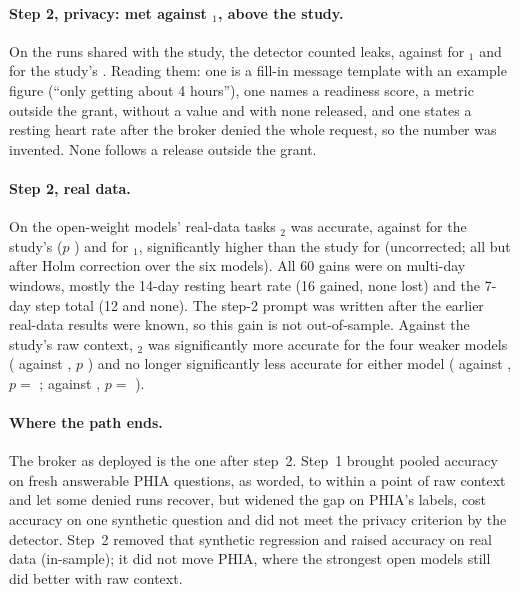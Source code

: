 \paragraph{Step 2, privacy: met against \CC{}$_1$, above the study.} On the \vthreePrivN{} runs shared with the study,
the detector counted \vthreePrivThree{} leaks, against \vthreePrivTwo{} for \CC{}$_1$ and \vthreePrivOne{} for the
study's \CC{}. Reading them: one is a fill-in message template with an example figure (``only getting about 4
hours''), one names a readiness score, a metric outside the grant, without a value and with none released, and one
states a resting heart rate after the broker denied the whole request, so the number was invented. None follows a
release outside the grant.

\paragraph{Step 2, real data.} On the open-weight models' real-data tasks \CC{}$_2$ was \vthreeRealThree{}
accurate, against \vthreeRealOne{} for the study's \CC{} ($p$ \vthreeRealP{}) and
\vthreeRealTwo{} for \CC{}$_1$, significantly higher than the study for \vthreeRealSig{} (uncorrected; all but
 after Holm correction over the six models). All 60 gains were on multi-day windows, mostly the
14-day resting heart rate (16 gained, none lost) and the 7-day step total (12 and none). The step-2 prompt was
written after the earlier real-data results were known, so this gain is not out-of-sample.
Against the study's raw context, \CC{}$_2$ was significantly more accurate for the four weaker models
( \vthreeRealLlamaThree{} against \vthreeRealLlamaThreeA{}, $p$ \vthreeRealPALlamaThree{}) and no longer significantly less accurate for either  model ( \vthreeRealOssLarge{}
against \vthreeRealOssLargeA{}, $p=$ \vthreeRealPAOssLarge{};  \vthreeRealOssSmall{} against
\vthreeRealOssSmallA{}, $p=$ \vthreeRealPAOssSmall{}).

\paragraph{Where the path ends.} The broker as deployed is the one after step~2. Step~1 brought pooled accuracy on
fresh answerable PHIA questions, as worded, to within a point of raw context and let some denied runs
recover, but widened the gap on PHIA's labels, cost accuracy on one synthetic question and did not meet the privacy
criterion by the detector. Step~2 removed that synthetic regression and raised accuracy on real data (in-sample); it did
not move PHIA, where the strongest open models still did better with raw context.
